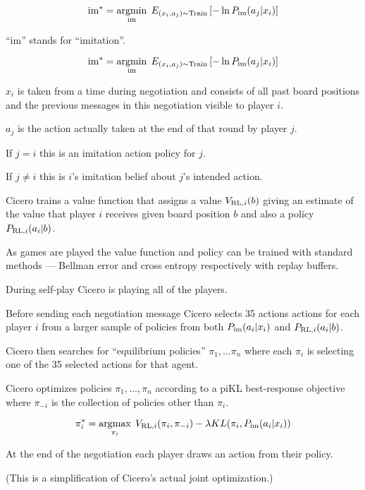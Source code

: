 {\vfill
$$\mathrm{im}^* = \operatorname*{argmin}_{\mathrm{im}}\;E_{(x_i,a_j) \sim \mathrm{Train}}\left[-\ln P_{\mathrm{im}}(a_j|x_i)\right]$$

\vfill
``im'' stands for ``imitation''.


$$\mathrm{im}^* = \operatorname*{argmin}_{\mathrm{im}}\;E_{(x_i,a_j) \sim \mathrm{Train}}\left[-\ln P_{\mathrm{im}}(a_j|x_i)\right]$$

\vfill
$x_i$ is taken from a time during negotiation and
consists of all past board positions and the previous messages in this negotiation visible to player $i$.

\vfill
$a_j$ is the action actually taken at the end of that round by player $j$.

\vfill
If $j = i$ this is an imitation action policy for $j$.

\vfill
If $j \ne i$ this is $i$'s imitation belief about $j$'s intended action.



Cicero trains a value function that assigns a value $V_{\mathrm{RL},i}(b)$ giving an estimate of the value that player $i$ receives 
given board position $b$ and also a policy $P_{\mathrm{RL},i}(a_i|b)$.

\vfill
As games are played the value function and policy can be trained with standard methods --- Bellman error and cross entropy respectively
with replay buffers.


During self-play Cicero is playing all of the players.

\vfill
Before sending each negotiation message Cicero selects 35 actions actions for each player $i$
from a larger sample of policies from both $P_{\mathrm{im}}(a_i|x_i)$ and $P_{\mathrm{RL},i}(a_i|b)$.

\vfill
Cicero then searches for ``equilibrium policies'' $\pi_1,\ldots \pi_n$ where each $\pi_i$ is selecting one of the 35 selected actions for that agent.


Cicero optimizes policies $\pi_1,\ldots,\pi_n$ according to a piKL best-response objective
where $\pi_{-i}$ is the collection of policies other than $\pi_i$.

\vfill
$$\pi_i^* = \operatorname*{argmax}_{\pi_i}\;V_{\mathrm{RL},i}(\pi_i,\pi_{-i}) - \lambda KL(\pi_i,P_{\mathrm{im}}(a_i|x_i))$$

\vfill
At the end of the negotiation each player draws an action from their policy.

\vfill
(This is a simplification of Cicero's actual joint optimization.)

}
